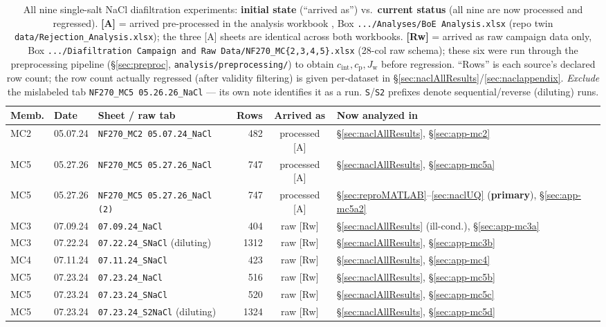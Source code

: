 \documentclass[11pt]{article}
\newcommand{\Jw}{J_{\mathrm{w}}}
\newcommand{\cint}{c_{\mathrm{int}}}
\newcommand{\cp}{c_{\mathrm{p}}}
\begin{document}
\begin{table}[H]
\centering\footnotesize
\begin{tabular}{ll l r c l}
\toprule
Memb. & Date & Sheet / raw tab & Rows & Arrived as & Now analyzed in \\
\midrule
MC2 & 05.07.24 & \texttt{NF270\_MC2 05.07.24\_NaCl}      & 482  & processed [A] & \S\ref{sec:naclAllResults}, \S\ref{sec:app-mc2} \\
MC5 & 05.27.26 & \texttt{NF270\_MC5 05.27.26\_NaCl}      & 747  & processed [A] & \S\ref{sec:naclAllResults}, \S\ref{sec:app-mc5a} \\
MC5 & 05.27.26 & \texttt{NF270\_MC5 05.27.26\_NaCl (2)}  & 747  & processed [A] & \S\ref{sec:reproMATLAB}--\ref{sec:naclUQ} (\textbf{primary}), \S\ref{sec:app-mc5a2} \\
MC3 & 07.09.24 & \texttt{07.09.24\_NaCl}                 & 404  & raw [Rw]      & \S\ref{sec:naclAllResults} (ill-cond.), \S\ref{sec:app-mc3a} \\
MC3 & 07.22.24 & \texttt{07.22.24\_SNaCl} (diluting)     & 1312 & raw [Rw]      & \S\ref{sec:naclAllResults}, \S\ref{sec:app-mc3b} \\
MC4 & 07.11.24 & \texttt{07.11.24\_SNaCl}                & 423  & raw [Rw]      & \S\ref{sec:naclAllResults}, \S\ref{sec:app-mc4} \\
MC5 & 07.23.24 & \texttt{07.23.24\_NaCl}                 & 516  & raw [Rw]      & \S\ref{sec:naclAllResults}, \S\ref{sec:app-mc5b} \\
MC5 & 07.23.24 & \texttt{07.23.24\_SNaCl}                & 520  & raw [Rw]      & \S\ref{sec:naclAllResults}, \S\ref{sec:app-mc5c} \\
MC5 & 07.23.24 & \texttt{07.23.24\_S2NaCl} (diluting)    & 1324 & raw [Rw]      & \S\ref{sec:naclAllResults}, \S\ref{sec:app-mc5d} \\
\bottomrule
\end{tabular}
\caption{All nine single-salt NaCl diafiltration experiments: \textbf{initial
state} (``arrived as'') vs.\ \textbf{current status} (all nine are now processed
and regressed). \textbf{[A]} = arrived pre-processed in the analysis workbook
\cite{boeAnalysisWorkbook}, Box \texttt{.../Analyses/BoE Analysis.xlsx} (repo twin
\texttt{data/Rejection\_Analysis.xlsx}); the three [A] sheets are identical across
both workbooks. \textbf{[Rw]} = arrived as raw campaign data only, Box
\texttt{.../Diafiltration Campaign and Raw Data/NF270\_MC\{2,3,4,5\}.xlsx}
\cite{rawCampaignMC2,rawCampaignMC3,rawCampaignMC4,rawCampaignMC5} (28-col raw
schema); these six were run through the preprocessing pipeline
(\S\ref{sec:preproc}, \texttt{analysis/preprocessing/}) to obtain $\cint,\cp,\Jw$
before regression. ``Rows'' is each source's declared row count; the row count
actually regressed (after validity filtering) is given per-dataset in
\S\ref{sec:naclAllResults}/\ref{sec:naclappendix}. \emph{Exclude} the mislabeled
tab \texttt{NF270\_MC5 05.26.26\_NaCl} --- its own note identifies it as a
 run. \texttt{S}/\texttt{S2} prefixes denote sequential/reverse
(diluting) runs.}
\label{tab:nacldata}
\end{table}
\end{document}
